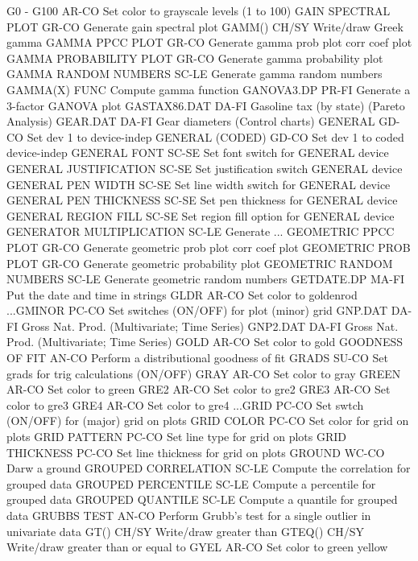 G0 - G100                   AR-CO Set color to grayscale levels (1 to 100)
GAIN SPECTRAL PLOT          GR-CO Generate gain spectral plot
GAMM()                      CH/SY Write/draw Greek gamma
GAMMA PPCC PLOT             GR-CO Generate gamma prob plot corr coef plot
GAMMA PROBABILITY PLOT      GR-CO Generate gamma probability plot
GAMMA RANDOM NUMBERS        SC-LE Generate gamma random numbers
GAMMA(X)                    FUNC  Compute gamma function
GANOVA3.DP                  PR-FI Generate a 3-factor GANOVA plot
GASTAX86.DAT                DA-FI Gasoline tax (by state) (Pareto Analysis)
GEAR.DAT                    DA-FI Gear diameters (Control charts)
GENERAL                     GD-CO Set dev 1 to device-indep
GENERAL (CODED)             GD-CO Set dev 1 to coded device-indep
GENERAL FONT                SC-SE Set font switch for GENERAL device
GENERAL JUSTIFICATION       SC-SE Set justification switch GENERAL device
GENERAL PEN WIDTH           SC-SE Set line width switch for GENERAL device
GENERAL PEN THICKNESS       SC-SE Set pen thickness for GENERAL device
GENERAL REGION FILL         SC-SE Set region fill option for GENERAL device
GENERATOR MULTIPLICATION    SC-LE Generate ...
GEOMETRIC PPCC PLOT         GR-CO Generate geometric prob plot corr coef plot
GEOMETRIC PROB PLOT         GR-CO Generate geometric probability plot
GEOMETRIC RANDOM NUMBERS    SC-LE Generate geometric random numbers
GETDATE.DP                  MA-FI Put the date and time in strings
GLDR                        AR-CO Set color to goldenrod
...GMINOR                   PC-CO Set switches (ON/OFF) for plot (minor) grid
GNP.DAT                     DA-FI Gross Nat. Prod. (Multivariate; Time Series)
GNP2.DAT                    DA-FI Gross Nat. Prod. (Multivariate; Time Series)
GOLD                        AR-CO Set color to gold
GOODNESS OF FIT             AN-CO Perform a distributional goodness of fit
GRADS                       SU-CO Set grads for trig calculations (ON/OFF)
GRAY                        AR-CO Set color to gray
GREEN                       AR-CO Set color to green
GRE2                        AR-CO Set color to gre2
GRE3                        AR-CO Set color to gre3
GRE4                        AR-CO Set color to gre4
...GRID                     PC-CO Set swtch (ON/OFF) for (major) grid on plots
GRID COLOR                  PC-CO Set color for grid on plots
GRID PATTERN                PC-CO Set line type for grid on plots
GRID THICKNESS              PC-CO Set line thickness for grid on plots
GROUND                      WC-CO Darw a ground
GROUPED CORRELATION         SC-LE Compute the correlation for grouped data
GROUPED PERCENTILE          SC-LE Compute a percentile for grouped data
GROUPED QUANTILE            SC-LE Compute a quantile for grouped data
GRUBBS TEST                 AN-CO Perform Grubb's test for a single outlier in univariate data
GT()                        CH/SY Write/draw greater than
GTEQ()                      CH/SY Write/draw greater than or equal to
GYEL                        AR-CO Set color to green yellow

